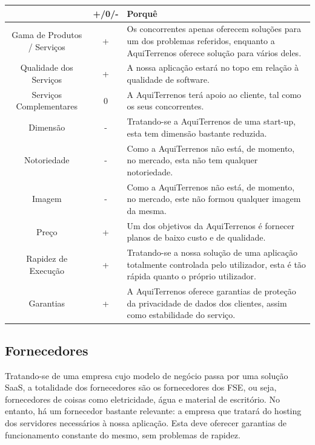 \documentclass[11pt]{article}
\begin{document}
	\begin{center}
		\begin{tabularx}{\linewidth}{ | c | c | X | }
			\hline
			& +/0/- & Porquê \\
			\hline
			Gama de Produtos / Serviços & + & Os concorrentes apenas oferecem soluções para um dos problemas referidos, enquanto a AquiTerrenos oferece solução para vários deles. \\
			\hline
			Qualidade dos Serviços & + & A nossa aplicação estará no topo em relação à qualidade de software. \\
			\hline
			Serviços Complementares & 0 & A AquiTerrenos terá apoio ao cliente, tal como os seus concorrentes. \\
			\hline 
			Dimensão & - & Tratando-se a AquiTerrenos de uma start-up, esta tem dimensão bastante reduzida. \\
			\hline   
			Notoriedade & - & Como a AquiTerrenos não está, de momento, no mercado, esta não tem qualquer notoriedade. \\
			\hline
			Imagem & - & Como a AquiTerrenos não está, de momento, no mercado, este não formou qualquer imagem da mesma. \\
			\hline
			Preço & + & Um dos objetivos da AquiTerrenos é fornecer planos de baixo custo e de qualidade. \\
			\hline
			Rapidez de Execução & + & Tratando-se a nossa solução de uma aplicação totalmente controlada pelo utilizador, esta é tão rápida quanto o próprio utilizador. \\
			\hline
			Garantias & + & A AquiTerrenos oferece garantias de proteção da privacidade de dados dos clientes, assim como estabilidade do serviço. \\
			\hline
		\end{tabularx}
	\end{center}
	
	
	\large
	\subsection{Fornecedores}
	
	\normalsize
	
	Tratando-se de uma empresa cujo modelo de negócio passa por uma solução SaaS, a totalidade dos fornecedores são os fornecedores dos FSE, ou seja, fornecedores de coisas como eletricidade, água e material de escritório. No entanto, há um fornecedor bastante relevante: a empresa que tratará do hosting dos servidores necessários à nossa aplicação. Esta deve oferecer garantias de funcionamento constante do mesmo, sem problemas de rapidez.
	
\end{document}
